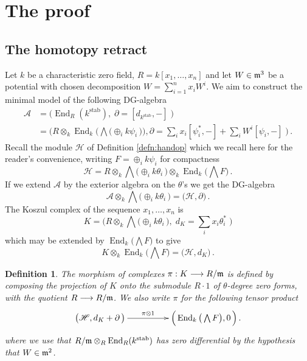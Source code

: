 \documentclass[english,letter paper,12pt,leqno]{article}
\theoremstyle{example}
\newtheorem{definition}[theorem]{Definition}
\numberwithin{equation}{section}
\def\stab{\operatorname{stab}}
\def\be{\begin{equation}}
\def\ee{\end{equation}}
\DeclareMathOperator{\End}{End}
\begin{document}
\section{The proof}

\subsection{The homotopy retract}

Let $k$ be a characteristic zero field, $R =  k[x_1,\ldots,x_n]$ and let $W \in \mathfrak{m}^3$ be a potential with chosen decomposition $W = \sum_{i=1}^n x_i W^i$. We aim to construct the minimal model of the following DG-algebra
\begin{align*}
\mathscr{A} &= \Big( \End_{R}(k^{\operatorname{stab}}), \; \partial = [d_{k^{\stab}},-] \; \Big)\\
&= \Big( R \otimes_k \End_k\Big( \bigwedge\big( \oplus_i k\psi_i \,\big) \Big),  \partial = \sum_i x_i [\psi_i^*,-] + \sum_i W^i [\psi_i,-] \;\Big)\,.
\end{align*}
Recall the module $\mathscr{H}$ of Definition \ref{defn:handop} which we recall here for the reader's convenience, writing $F = \oplus_i k \psi_i$ for compactness
\[
\mathscr{H} = R \otimes_k \bigwedge\big( \oplus_i k \theta_i \,\big) \otimes_k \End_k\Big( \bigwedge F \Big)\,.
\]
If we extend $\mathscr{A}$ by the exterior algebra on the $\theta$'s we get the DG-algebra
\[
\mathscr{A} \otimes_k \bigwedge\big( \oplus_i k\theta_i \,\big) = \big( \mathscr{H}, \partial \big)\,.
\]
The Koszul complex of the sequence $x_1,\ldots,x_n$ is
\be\label{eq:defnkoszulK}
K = \Big( R \otimes_k \bigwedge\big( \oplus_i k \theta_i \,\big), \; d_K = \sum_i x_i \theta_i^*\; \Big)
\ee
which may be extended by $\End_k\big( \bigwedge F \big)$ to give
\[
K \otimes_k \End_k\big( \bigwedge F \big) = \big( \mathscr{H}, d_K \big)\,.
\]

\begin{definition} The morphism of complexes $\pi: K \longrightarrow R/\mathfrak{m}$ is defined by composing the projection of $K$ onto the submodule $R \cdot 1$ of $\theta$-degree zero forms, with the quotient $R \longrightarrow R/\mathfrak{m}$. We also write $\pi$ for the following tensor product
\[
\xymatrix@C+2pc{
\big( \mathscr{H}, d_K + \partial \,\big) \ar[r]^-{\pi \otimes 1} & \Big( \End_k\big( \bigwedge F \big), 0 \,\Big)\,.
}
\]
where we use that $R/\mf{m} \otimes_R \End_R(k^{\stab})$ has zero differential by the hypothesis that $W \in \mathfrak{m}^2$. 
\end{definition}
\end{document}
